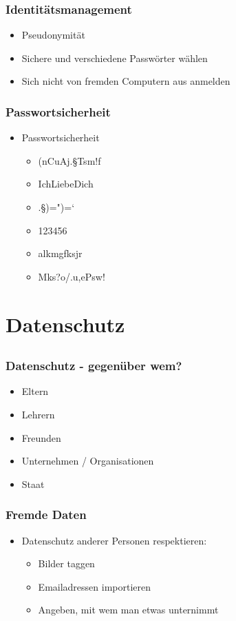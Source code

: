 \documentclass[12pt]{beamer}
\begin{document}
\begin{frame}
  \frametitle{Identitätsmanagement}
  \begin{itemize}[<+->]
    \item Pseudonymität
    \item Sichere und verschiedene Passwörter wählen
    \item Sich nicht von fremden Computern aus anmelden
  \end{itemize}
\end{frame}

\begin{frame}
  \frametitle{Passwortsicherheit}
  \begin{itemize}
    \item Passwortsicherheit 
      \begin{itemize}
        \item (nCuAj.§Tsm!f
        \item IchLiebeDich
        \item .§)=")=`
        \item 123456
        \item alkmgfksjr
        \item Mks?o/.u,ePsw!
      \end{itemize}
  \end{itemize}
\end{frame}

\section{Datenschutz}
\subsection{}

\begin{frame}
  \frametitle{Datenschutz - gegenüber wem?}
    \begin{itemize}
      \item<2-> Eltern
      \item<3-> Lehrern
      \item<4-> Freunden
      \item<5-> Unternehmen / Organisationen
      \item<6-> Staat
    \end{itemize}
\end{frame}

\begin{frame}
  \frametitle{Fremde Daten}
  \begin{itemize}
    \item Datenschutz anderer Personen respektieren:
      \begin{itemize}
        \item<2->Bilder taggen
        \item<3->Emailadressen importieren
        \item<4->Angeben, mit wem man etwas unternimmt
      \end{itemize}
  \end{itemize}
\end{frame}
\end{document}
